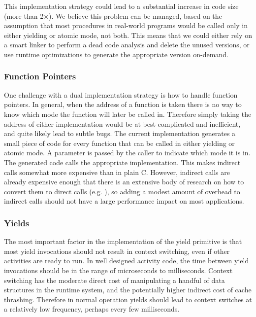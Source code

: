 \documentclass[preprint, 10pt, numbers]{sigplanconf}
\begin{document}
This implementation strategy could lead to a substantial increase in code size (more than 2$\times$).
We believe this problem can be managed, based on the assumption that most procedures in real-world programs would be called only in either yielding or atomic mode, not both.
This means that we could either rely on a smart linker to perform a dead code analysis and delete the unused versions, or use runtime optimizations to generate the appropriate version on-demand.


\subsubsection{Function Pointers}

One challenge with a dual implementation strategy is how to handle function pointers.
In general, when the address of a function is taken there is no way to know which mode the function will later be called in.
Therefore simply taking the address of either implementation would be at best complicated and inefficient, and quite likely lead to subtle bugs.
The current implementation generates a small piece of code for every function that can be called in either yielding or atomic mode.
A parameter is passed by the caller to indicate which mode it is in.
The generated code calls the appropriate implementation.
This makes indirect calls somewhat more expensive than in plain C.
However, indirect calls are already expensive enough that there is an extensive body of research on how to convert them to direct calls (e.g. \cite{Dean1995}), so adding a modest amount of overhead to indirect calls should not have a large performance impact on most applications.

\subsubsection{Yields}

The most important factor in the implementation of the yield primitive is that most yield invocations should not result in context switching, even if other activities are ready to run.
In well designed activity code, the time between yield invocations should be in the range of microseconds to milliseconds.
Context switching has the moderate direct cost of manipulating a handful of data structures in the runtime system, and the potentially higher indirect cost of cache thrashing.
Therefore in normal operation yields should lead to context switches at a relatively low frequency, perhaps every few milliseconds.
\end{document}
